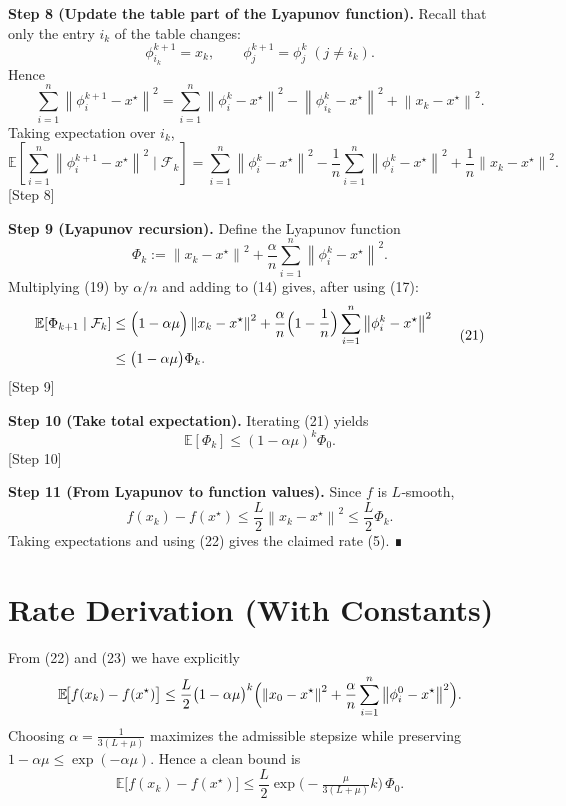 \documentclass{article}
\newcommand{\E}{\mathbb{E}}
\newcommand{\norm}[1]{\left\|#1\right\|}
\begin{document}
\noindent\textbf{Step 8 (Update the table part of the Lyapunov function).}  
Recall that only the entry $i_k$ of the table changes:
\[
\phi_{i_k}^{k+1}=x_k,\qquad
\phi_{j}^{k+1}=\phi_{j}^{k}\;(j\neq i_k).
\]
Hence
\[
\sum_{i=1}^{n}\norm{\phi_i^{k+1}-x^{\star}}^{2}
= \sum_{i=1}^{n}\norm{\phi_i^{k}-x^{\star}}^{2}
   -\norm{\phi_{i_k}^{k}-x^{\star}}^{2}
   +\norm{x_k-x^{\star}}^{2}.
\tag{18}
\]
Taking expectation over $i_k$,
\[
\E\!\left[\sum_{i=1}^{n}\norm{\phi_i^{k+1}-x^{\star}}^{2}\mid\mathcal{F}_k\right]
= \sum_{i=1}^{n}\norm{\phi_i^{k}-x^{\star}}^{2}
   -\frac1n\sum_{i=1}^{n}\norm{\phi_i^{k}-x^{\star}}^{2}
   +\frac1n\norm{x_k-x^{\star}}^{2}.
\tag{19}
\]
[Step 8]

\noindent\textbf{Step 9 (Lyapunov recursion).}  
Define the Lyapunov function
\[
\Phi_k := \norm{x_k-x^{\star}}^{2}
          +\frac{\alpha}{n}\sum_{i=1}^{n}\norm{\phi_i^{k}-x^{\star}}^{2}.
\tag{20}
\]
Multiplying (19) by $\alpha/n$ and adding to (14) gives, after using (17):
\[
\begin{aligned}
\E[\Phi_{k+1}\mid\mathcal{F}_k]
&\le \Bigl(1-\alpha\mu\Bigr)\norm{x_k-x^{\star}}^{2}
   +\frac{\alpha}{n}\Bigl(1-\frac1n\Bigr)\sum_{i=1}^{n}\norm{\phi_i^{k}-x^{\star}}^{2}\\
&\le \bigl(1-\alpha\mu\bigr)\Phi_k .
\end{aligned}
\tag{21}
\]
[Step 9]

\noindent\textbf{Step 10 (Take total expectation).}  
Iterating (21) yields
\[
\E[\Phi_k]\le (1-\alpha\mu)^{k}\Phi_0 .
\tag{22}
\]
[Step 10]

\noindent\textbf{Step 11 (From Lyapunov to function values).}  
Since $f$ is $L$‑smooth,
\[
f(x_k)-f(x^{\star})\le \frac{L}{2}\norm{x_k-x^{\star}}^{2}
\le \frac{L}{2}\Phi_k .
\tag{23}
\]
Taking expectations and using (22) gives the claimed rate (5). ∎

\section*{Rate Derivation (With Constants)}
From (22) and (23) we have explicitly
\[
\E\!\bigl[f(x_k)-f(x^{\star})\bigr]
\le \frac{L}{2}\bigl(1-\alpha\mu\bigr)^{k}
      \Bigl(\norm{x_0-x^{\star}}^{2}
            +\frac{\alpha}{n}\sum_{i=1}^{n}\norm{\phi_i^{0}-x^{\star}}^{2}\Bigr).
\]
Choosing $\alpha = \frac{1}{3(L+\mu)}$ maximizes the admissible stepsize while preserving $1-\alpha\mu\le \exp(-\alpha\mu)$. Hence a clean bound is
\[
\E\!\bigl[f(x_k)-f(x^{\star})\bigr]
\le \frac{L}{2}\exp\!\bigl(-\tfrac{\mu}{3(L+\mu)}k\bigr)\,
      \Phi_0 .
\]
\end{document}
